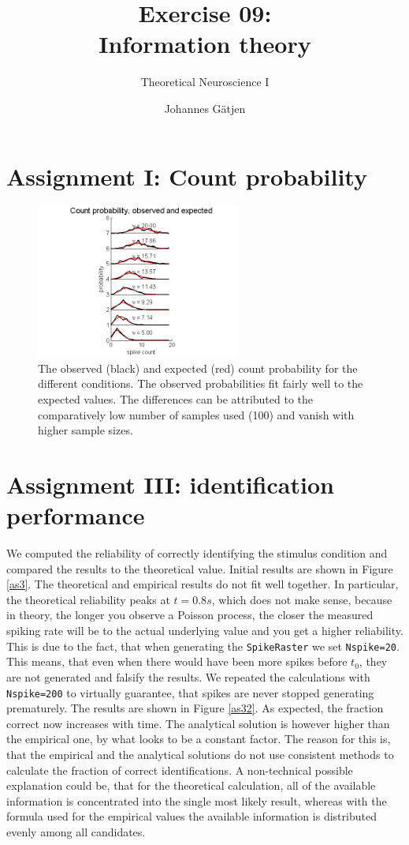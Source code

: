\documentclass{scrartcl}
\title{Exercise 09:\\Information theory}
\subtitle{Theoretical Neuroscience I}
\author{Johannes G\"atjen}
\begin{document}
\maketitle
\section{Assignment I: Count probability}

\begin{figure}[h]
\centering
\includegraphics[trim = {1.3cm 0 1.5cm 0.1cm}, width=0.6\textwidth, clip]{../pics/as1}
\caption{The observed (black) and expected (red) count probability for the different conditions. The observed probabilities fit fairly well to the expected values. The differences can be attributed to the comparatively low number of samples used (100) and vanish with higher sample sizes.}
\label{as1}
\end{figure}

\section{Assignment III: identification performance}

We computed the reliability of correctly identifying the stimulus condition and compared the results to the theoretical value. Initial results are shown in Figure \ref{as3}. The theoretical and empirical results do not fit well together. In particular, the theoretical reliability peaks at $t=0.8\si{s}$, which does not make sense, because in theory, the longer you observe a Poisson process, the closer the measured spiking rate will be to the actual underlying value and you get a higher reliability. This is due to the fact, that when generating the \texttt{SpikeRaster} we set \texttt{Nspike=20}. This means, that even when there would have been more spikes before $t_0$, they are not generated and falsify the results. We repeated the calculations with \texttt{Nspike=200} to virtually guarantee, that spikes are never stopped generating prematurely. The results are shown in Figure \ref{as32}. As expected, the fraction correct now increases with time. The analytical solution is however higher than the empirical one, by what looks to be a constant factor. The reason for this is, that the empirical and the analytical solutions do not use consistent methods to calculate the fraction of correct identifications. A non-technical possible explanation could be, that for the theoretical calculation, all of the available information is concentrated into the single most likely result, whereas with the formula used for the empirical values the available information is distributed evenly among all candidates.
\end{document}

